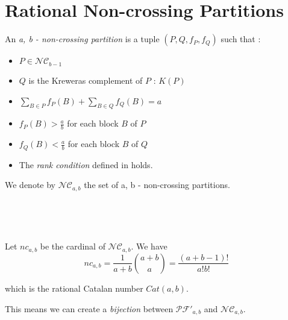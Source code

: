 \section{Rational Non-crossing Partitions}

\begin{definition}
    An \emph{a, b - non-crossing partition} is a tuple
    $(P, Q, f_P, f_Q)$ such that :
    \begin{itemize}
        \item $P \in \mathcal{NC}_{b - 1}$
        \item $Q$ is the Kreweras complement of $P$ : $K(P)$
        \item $\displaystyle \sum_{B \in P}{f_P(B)} + 
                \sum_{B \in Q}{f_Q(B)} = a$
        \item $f_P(B) > \frac{a}{b}$ for each block $B$
                of $P$
        \item $f_Q(B) < \frac{a}{b}$ for each block $B$
                of $Q$
        \item The \emph{rank condition} defined in
                \cite{ref8} holds.
    \end{itemize}
\end{definition}

We denote by $\mathcal{NC}_{a,b}$ the set of 
a, b - non-crossing partitions.

\begin{example}[$a > b : a = 7, b = 3$]
    ~\\
    \begin{center}
        
    \end{center}
\end{example}

\begin{example}[$a < b : a = 3, b = 5$]
    ~\\
    \begin{center}
        
    \end{center}
\end{example}

\begin{theorem}[Bodnar, 2017]
    Let $nc_{a,b}$ be the cardinal of $\mathcal{NC}_{a,b}$.
    We have $$nc_{a,b} = \frac{1}{a+b} \binom{a+b}{a} = 
    \frac{(a+b-1)!}{a!b!}$$
\end{theorem}

which is the rational Catalan number $Cat(a,b)$.

\begin{prop}
    This means we can create a \emph{bijection} between
    $\mathcal{PF'}_{a,b}$ and $\mathcal{NC}_{a,b}$.
\end{prop}

